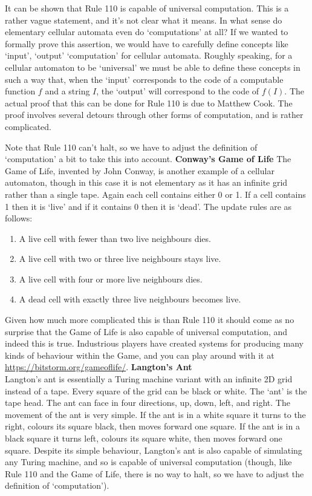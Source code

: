 \documentclass{article}
\theoremstyle{plain}
\theoremstyle{definition}
\begin{document}
It can be shown that Rule 110 is capable of universal computation. This is a rather vague statement, and it's not clear what it means. In what sense do elementary cellular automata even do `computations' at all? If we wanted to formally prove this assertion, we would have to carefully define concepts like `input', `output' `computation' for cellular automata. Roughly speaking, for a cellular automaton to be `universal' we must be able to define these concepts in such a way that, when the `input' corresponds to the code of a computable function $f$ and a string $I$, the `output' will correspond to the code of $f(I)$. The actual proof that this can be done for Rule 110 is due to Matthew Cook. The proof involves several detours through other forms of computation, and is rather complicated.

Note that Rule 110 can't halt, so we have to adjust the definition of `computation' a bit to take this into account.  
\newline
\newline
\textbf{Conway's Game of Life}\newline
The Game of Life, invented by John Conway, is another example of a cellular automaton, though in this case it is not elementary as it has an infinite grid rather than a single tape. Again each cell contains either 0 or 1. If a cell contains 1 then it is `live' and if it contains 0 then it is `dead'. The update rules are as follows:
\begin{enumerate}
\item A live cell with fewer than two live neighbours dies.
\item A live cell with two or three live neighbours stays live.
\item A live cell with four or more live neighbours dies.
\item A dead cell with exactly three live neighbours becomes live. 
\end{enumerate}

Given how much more complicated this is than Rule 110 it should come as no surprise that the Game of Life is also capable of universal computation, and indeed this is true. Industrious players have created systems for producing many kinds of behaviour within the Game, and you can play around with it at \url{https://bitstorm.org/gameoflife/}.
\newline
\newline
\textbf{Langton's Ant}\\
Langton's ant is essentially a Turing machine variant with an infinite 2D grid instead of a tape. Every square of the grid can be black or white. The `ant' is the tape head. The ant can face in four directions, up, down, left, and right. The movement of the ant is very simple. If the ant is in a white square it turns to the right, colours its square black, then moves forward one square. If the ant is in a black square it turns left, colours its square white, then moves forward one square. Despite its simple behaviour, Langton's ant is also capable of simulating any Turing machine, and so is capable of universal computation (though, like Rule 110 and the Game of Life, there is no way to halt, so we have to adjust the definition of `computation').
\end{document}
